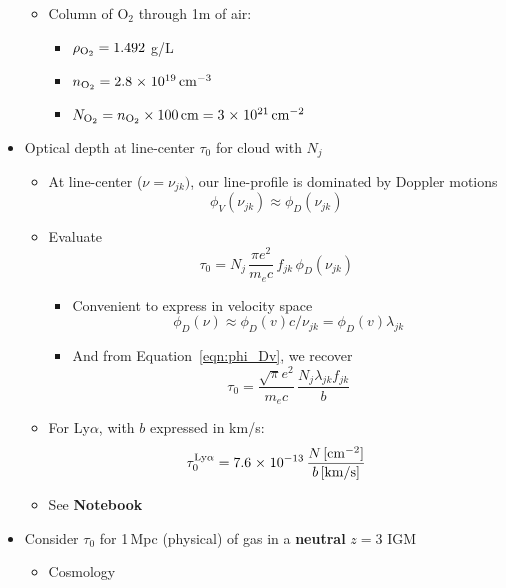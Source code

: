 \documentclass[12pt,letterpaper]{article}
\begin{document}
\begin{Aenumerate}
\begin{itemize}
\begin{itemize}
		\item Column of O$_2$ through 1m of air:
			\begin{itemize}
		   	\item $\rho_{\rm O_2} = 1.492$ g/L
		   	\item $n_{\rm O_2} = 2.8 {\; \times \; 10^{19}} \, {\rm cm^{-3}}$
		   	\item $N_{\rm O_2} = n_{\rm O_2} \times 100\,{\rm cm} = 3{\; \times \; 10^{21}} \, {\rm cm^{-2}}$
			\end{itemize}
		\end{itemize}
	\item Optical depth at line-center $\tau_0$ for cloud with $N_j$
		\begin{itemize}
		\item At line-center ($\nu = \nu_{jk})$, 
		our line-profile is dominated by Doppler motions
		\begin{equation}
		\phi_V(\nu_{jk}) \approx \phi_D (\nu_{jk})
		\end{equation}
		\item Evaluate
		\begin{equation}
		\tau_0 = N_j \, \frac{\pi e^2}{m_e c} \, f_{jk} \, \phi_D(\nu_{jk})
		\end{equation}
			\begin{itemize}
			\item Convenient to express in velocity space
			\begin{equation}
			\phi_D(\nu) \approx \phi_D(v) c/\nu_{jk} = \phi_D(v) \lambda_{jk}
			\end{equation}
			\item And from Equation~\ref{eqn:phi_Dv}, we recover
		\begin{equation}
		\tau_0 =  \frac{\sqrt{\pi} e^2}{m_e c} \, \frac{N_j \lambda_{jk} f_{jk}}{b}
		\end{equation}
			\end{itemize}
		\item For Ly$\alpha$, with $b$ expressed in km/s:
		\begin{equation}
		\tau_0^{\rm Ly\alpha} =  7.6 {\; \times \; 10^{-13}} \, 
			\frac{N \, [\rm cm^{-2}]}{b \, [\rm km/s]}
		\label{eqn:tau0}
		\end{equation}
		\item See {\bf Notebook}
		\end{itemize}
	\item Consider $\tau_0$ for 1\,Mpc (physical) of gas in a {\bf neutral} $z=3$ IGM
		\begin{itemize}
		\item Cosmology

\end{itemize}
\end{itemize}
\end{Aenumerate}
\end{document}
